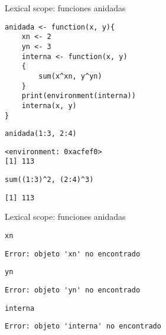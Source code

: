 \documentclass[xcolor={usenames,svgnames,dvipsnames}]{beamer}
\begin{document}
\begin{frame}[fragile,label={sec:orgheadline16}]{Lexical scope: funciones anidadas}
 \lstset{language=R,label= ,caption= ,captionpos=b,numbers=none}
\begin{lstlisting}
anidada <- function(x, y){
    xn <- 2
    yn <- 3
    interna <- function(x, y)
    {
        sum(x^xn, y^yn)
    }
    print(environment(interna))
    interna(x, y)
}
\end{lstlisting}

\lstset{language=R,label= ,caption= ,captionpos=b,numbers=none}
\begin{lstlisting}
anidada(1:3, 2:4)
\end{lstlisting}

\begin{verbatim}
<environment: 0xacfef0>
[1] 113
\end{verbatim}

\lstset{language=R,label= ,caption= ,captionpos=b,numbers=none}
\begin{lstlisting}
sum((1:3)^2, (2:4)^3)
\end{lstlisting}

\begin{verbatim}
[1] 113
\end{verbatim}
\end{frame}

\begin{frame}[fragile,label={sec:orgheadline17}]{Lexical scope: funciones anidadas}
 \lstset{language=R,label= ,caption= ,captionpos=b,numbers=none}
\begin{lstlisting}
xn
\end{lstlisting}

\begin{verbatim}
Error: objeto 'xn' no encontrado
\end{verbatim}

\lstset{language=R,label= ,caption= ,captionpos=b,numbers=none}
\begin{lstlisting}
yn
\end{lstlisting}

\begin{verbatim}
Error: objeto 'yn' no encontrado
\end{verbatim}

\lstset{language=R,label= ,caption= ,captionpos=b,numbers=none}
\begin{lstlisting}
interna
\end{lstlisting}

\begin{verbatim}
Error: objeto 'interna' no encontrado
\end{verbatim}
\end{frame}
\end{document}
